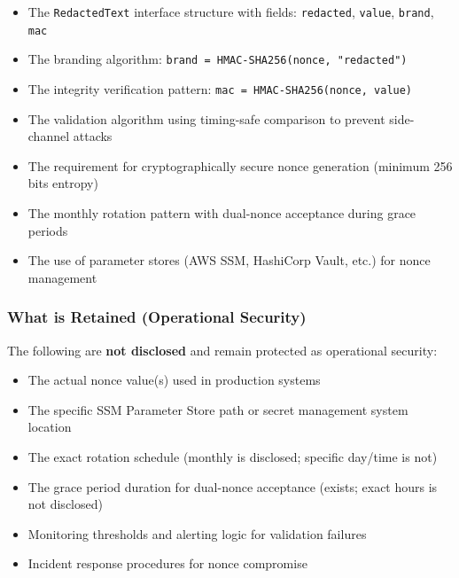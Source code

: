 \documentclass[11pt,a4paper]{article}
\begin{document}
\begin{itemize}
\item The \texttt{RedactedText} interface structure with fields: 
\texttt{redacted}, \texttt{value}, \texttt{brand}, \texttt{mac}

\item The branding algorithm: \texttt{brand = HMAC-SHA256(nonce, "redacted")}

\item The integrity verification pattern: 
\texttt{mac = HMAC-SHA256(nonce, value)}

\item The validation algorithm using timing-safe comparison to prevent 
side-channel attacks

\item The requirement for cryptographically secure nonce generation 
(minimum 256 bits entropy)

\item The monthly rotation pattern with dual-nonce acceptance during 
grace periods

\item The use of parameter stores (AWS SSM, HashiCorp Vault, etc.) 
for nonce management
\end{itemize}

\subsubsection{What is Retained (Operational Security)}

The following are \textbf{not disclosed} and remain protected as 
operational security:

\begin{itemize}
\item The actual nonce value(s) used in production systems

\item The specific SSM Parameter Store path or secret management 
system location

\item The exact rotation schedule (monthly is disclosed; specific day/time is not)

\item The grace period duration for dual-nonce acceptance (exists; exact hours is not disclosed)

\item Monitoring thresholds and alerting logic for validation failures

\item Incident response procedures for nonce compromise
\end{itemize}
\end{document}
